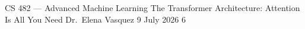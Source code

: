 \documentclass[11pt,a4paper]{article}
\begin{document}
\color{neutral}
\pagestyle{plain}

\handoutheader%
  {CS 482 — Advanced Machine Learning}%
  {The Transformer Architecture: Attention Is All You Need}%
  {Dr.\ Elena Vasquez}%
  {9 July 2026}%
  {6}








\end{document}
